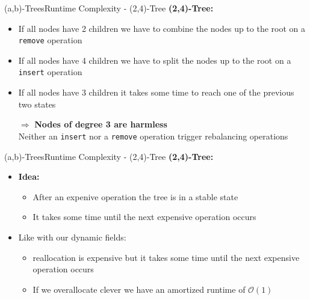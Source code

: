 
\begin{frame}{(a,b)-Trees}{Runtime Complexity - (2,4)-Tree}
  \textbf{(2,4)-Tree:}
  \begin{itemize}
    \item
      If all nodes have {\color{Mittel-Blau}2 children} we have to
      {\color{Mittel-Blau}combine} the nodes up to the root on a
      \texttt{\color{Mittel-Blau}remove} operation
    \item
      If all nodes have {\color{Mittel-Blau}4 children} we have to
      {\color{Mittel-Blau}split} the nodes up to the root on a
      \texttt{\color{Mittel-Blau}insert} operation
    \item
      If all nodes have {\color{Mittel-Blau}3 children} it takes some time
      to reach one of the previous two states
    \item[$\Rightarrow$]
      \textbf{Nodes of degree 3 are harmless}\\
      Neither an \texttt{\color{Mittel-Blau}insert} nor a
      \texttt{\color{Mittel-Blau}remove} operation trigger rebalancing
      operations
  \end{itemize}
\end{frame}


\begin{frame}{(a,b)-Trees}{Runtime Complexity - (2,4)-Tree}
  \textbf{(2,4)-Tree:}
  \begin{itemize}
    \item
      \textbf{Idea:}
      \begin{itemize}
        \item
          After an expenive operation the tree is in a stable state
        \item
          It takes some time until the next expensive operation occurs
      \end{itemize}
    \item
      Like with our dynamic fields:
      \begin{itemize}
        \item
          {\color{Mittel-Blau}reallocation} is expensive but it takes some time
          until the next expensive operation occurs
        \item
          If we {\color{Mittel-Blau}overallocate} clever we have an amortized
          runtime of {\color{Mittel-Blau}$\mathcal{O}(1)$}
      \end{itemize}
  \end{itemize}
\end{frame}

